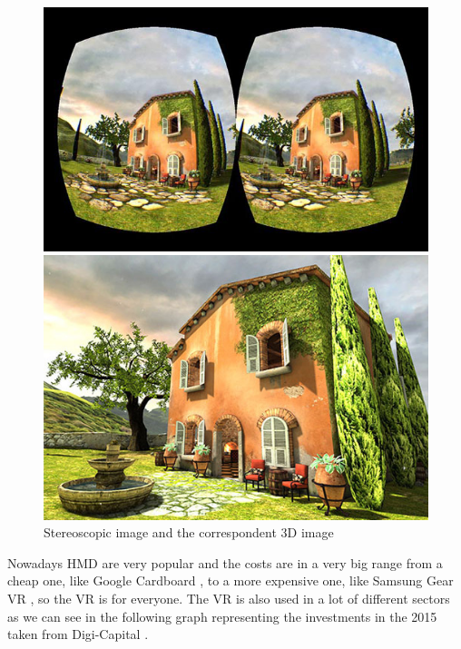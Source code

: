 \begin{figure}[H]
\centering
\begin{minipage}[c]{.40\textwidth}
\includegraphics[width=1\textwidth]{immagini/immaginedoppia.png}
\end{minipage}%
\hspace{10mm}%
\begin{minipage}[c]{.40\textwidth}
\includegraphics[width=1\textwidth]{immagini/immaginesingola.png}
\end{minipage}
\caption{Stereoscopic image and the correspondent 3D image}\label{fig:vrimages}
\end{figure}
Nowadays HMD are very popular and the costs are in a very big range from a cheap one, like Google Cardboard \cite{Cardboard}, to a more expensive one, like Samsung Gear VR \cite{Gear}, so the VR is for everyone. The VR is also used in a lot of different sectors as we can see in the following graph representing the investments in the 2015 taken from Digi-Capital \cite{DigiCapital}.
